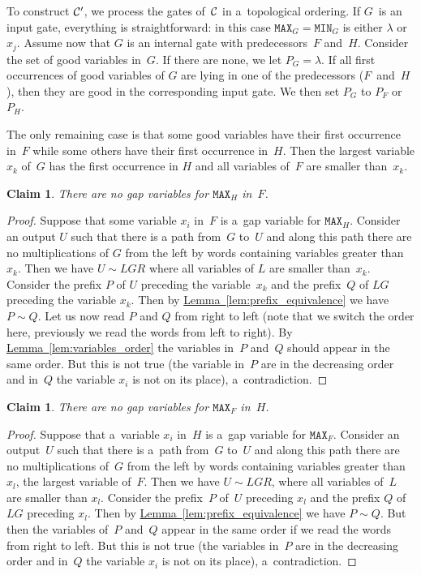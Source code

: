 \documentclass[11pt]{article}
\numberwithin{equation}{section}
\newtheorem{claim}[theorem]{Claim}
\theoremstyle{definition}
\theoremstyle{plain}
\newcommand{\expref}[2]{\hyperref[#2]{#1~\ref{#2}}}
\theoremstyle{plain}\newtheorem{observation}[theorem]{Observation}
\newcommand{\mmin}{\texttt{MIN}}
\newcommand{\mmax}{\texttt{MAX}}
\begin{document}
To construct ${\cal C}'$, we process the gates of~${\cal C}$ in a~topological ordering. If $G$~is an input gate, everything is straightforward: in this case $\mmax_G=\mmin_G$ is either $\lambda$ or $x_j$. Assume now that $G$ is an internal gate with predecessors~$F$ and~$H$.
Consider the set of good variables in~$G$. If there are none, we let $P_G=\lambda$. If all first occurrences of good variables of $G$ are lying in one of the predecessors ($F$~and~$H$), then they are good in the corresponding input gate. We then set $P_G$ to $P_F$ or $P_H$.

The only remaining case is that some good variables have their first occurrence in~$F$ while some others have their first occurrence in~$H$. Then the largest variable $x_k$ of~$G$ has the first occurrence in $H$ and all variables of~$F$ are smaller than~$x_k$.

\begin{claim} \label{cl: h is good}
    There are no gap variables for $\mmax_H$ in~$F$.
\end{claim}

\begin{proof}
    Suppose that some variable $x_i$ in~$F$ is a~gap variable for $\mmax_H$. Consider an output $U$ such that there is a path from~$G$ to~$U$ and along this path there are no multiplications of $G$ from the left by words containing variables greater than~$x_k$. Then we have $U \sim LGR$ where all variables of $L$ are smaller than~$x_k$. Consider the prefix $P$ of $U$ preceding the variable~$x_k$ and the prefix~$Q$ of $LG$ preceding the variable $x_k$.
    Then by \expref{Lemma}{lem:prefix_equivalence} we have $P \sim Q$. Let us now read $P$ and $Q$ from right to left (note that we switch the order here, previously we read the words from left to right). By \expref{Lemma}{lem:variables_order} the variables in~$P$ and~$Q$ should appear in the same order. But this is not true (the variable in~$P$ are in the decreasing order and in~$Q$ the variable $x_i$ is not on its place), a~contradiction.
\end{proof}

\begin{claim}\label{cl: f is good}
    There are no gap variables for $\mmax_F$ in~$H$.
\end{claim}

\begin{proof}
    Suppose that a~variable $x_i$ in~$H$ is a~gap variable for $\mmax_F$. Consider an output~$U$ such that there is a~path from~$G$ to~$U$ and along this path there are no multiplications of~$G$ from the left by words containing variables greater than $x_l$, the largest variable of~$F$. Then we have $U \sim LGR$, where all variables of~$L$ are smaller than $x_l$. Consider the prefix~$P$ of~$U$ preceding $x_l$ and the prefix $Q$ of $LG$ preceding $x_l$.
    Then by \expref{Lemma}{lem:prefix_equivalence} we have $P \sim Q$. But then the variables of~$P$ and~$Q$ appear in the same order if we read the words from right to left. But this is not true (the variables in~$P$ are in the decreasing order and in~$Q$ the variable $x_i$ is not on its place), a~contradiction.
\end{proof}
\end{document}
